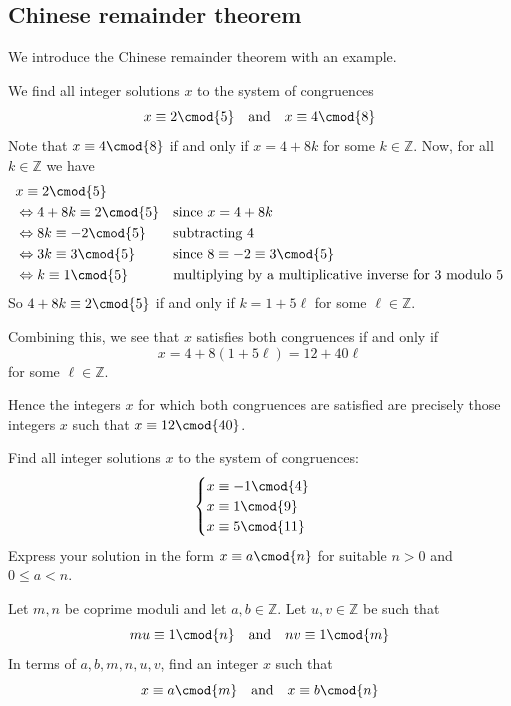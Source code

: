 \subsection*{Chinese remainder theorem}

We introduce the Chinese remainder theorem with an example.

\begin{example}
We find all integer solutions $x$ to the system of congruences
\[ x \equiv 2 \cmod{5} \quad \text{and} \quad x \equiv 4 \cmod{8} \]
Note that $x \equiv 4 \cmod{8}$ if and only if $x = 4+8k$ for some $k \in \mathbb{Z}$. Now, for all $k \in \mathbb{Z}$ we have
\begin{align*}
&x \equiv 2 \cmod{5} && \\
&\Leftrightarrow 4+8k \equiv 2 \cmod{5} && \text{since } x=4+8k \\
&\Leftrightarrow 8k \equiv -2 \cmod{5} && \text{subtracting $4$} \\
&\Leftrightarrow 3k \equiv 3 \cmod{5} && \text{since $8 \equiv -2 \equiv 3 \cmod{5}$} \\
&\Leftrightarrow k \equiv 1 \cmod{5} && \text{multiplying by a multiplicative inverse for $3$ modulo $5$}
\end{align*}
So $4+8k \equiv 2 \cmod{5}$ if and only if $k = 1 + 5\ell$ for some $\ell \in \mathbb{Z}$.

Combining this, we see that $x$ satisfies both congruences if and only if
\[ x = 4+8(1+5\ell) = 12+40\ell \]
for some $\ell \in \mathbb{Z}$.

Hence the integers $x$ for which both congruences are satisfied are precisely those integers $x$ such that $x \equiv 12 \cmod{40}$.
\end{example}

\begin{exercise}
Find all integer solutions $x$ to the system of congruences:
\[ \begin{cases}
x \equiv {-1} \cmod{4} \\
x \equiv 1 \cmod{9} \\
x \equiv 5 \cmod{11}
\end{cases} \]
Express your solution in the form $x \equiv a \cmod{n}$ for suitable $n > 0$ and $0 \le a < n$.
\end{exercise}

\begin{exercise}
\label{exCRTExistence}
Let $m,n$ be coprime moduli and let $a,b \in \mathbb{Z}$. Let $u,v \in \mathbb{Z}$ be such that
\[ mu \equiv 1 \cmod{n} \quad \text{and} \quad nv \equiv 1 \cmod{m} \]
In terms of $a,b,m,n,u,v$, find an integer $x$ such that
\[ x \equiv a \cmod{m} \quad \text{and} \quad x \equiv b \cmod{n} \]
\end{exercise}

